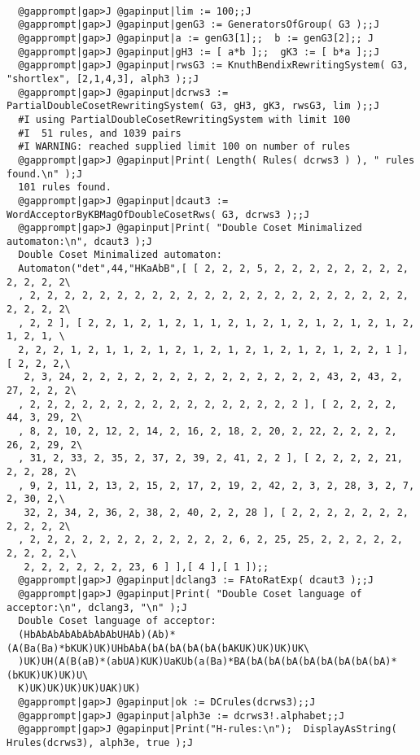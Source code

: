 \documentclass[a4paper,11pt]{report}
\begin{document}
{{ 
\begin{Verbatim}[commandchars=@|J,fontsize=\small,frame=single,label=Example]
  
  @gapprompt|gap>J @gapinput|lim := 100;;J
  @gapprompt|gap>J @gapinput|genG3 := GeneratorsOfGroup( G3 );;J
  @gapprompt|gap>J @gapinput|a := genG3[1];;  b := genG3[2];; J
  @gapprompt|gap>J @gapinput|gH3 := [ a*b ];;  gK3 := [ b*a ];;J
  @gapprompt|gap>J @gapinput|rwsG3 := KnuthBendixRewritingSystem( G3, "shortlex", [2,1,4,3], alph3 );;J
  @gapprompt|gap>J @gapinput|dcrws3 := PartialDoubleCosetRewritingSystem( G3, gH3, gK3, rwsG3, lim );;J
  #I using PartialDoubleCosetRewritingSystem with limit 100
  #I  51 rules, and 1039 pairs
  #I WARNING: reached supplied limit 100 on number of rules
  @gapprompt|gap>J @gapinput|Print( Length( Rules( dcrws3 ) ), " rules found.\n" );J
  101 rules found.
  @gapprompt|gap>J @gapinput|dcaut3 := WordAcceptorByKBMagOfDoubleCosetRws( G3, dcrws3 );;J
  @gapprompt|gap>J @gapinput|Print( "Double Coset Minimalized automaton:\n", dcaut3 );J
  Double Coset Minimalized automaton:
  Automaton("det",44,"HKaAbB",[ [ 2, 2, 2, 5, 2, 2, 2, 2, 2, 2, 2, 2, 2, 2, 2, 2\
  , 2, 2, 2, 2, 2, 2, 2, 2, 2, 2, 2, 2, 2, 2, 2, 2, 2, 2, 2, 2, 2, 2, 2, 2, 2, 2\
  , 2, 2 ], [ 2, 2, 1, 2, 1, 2, 1, 1, 2, 1, 2, 1, 2, 1, 2, 1, 2, 1, 2, 1, 2, 1, \
  2, 2, 2, 1, 2, 1, 1, 2, 1, 2, 1, 2, 1, 2, 1, 2, 1, 2, 1, 2, 2, 1 ], [ 2, 2, 2,\
   2, 3, 24, 2, 2, 2, 2, 2, 2, 2, 2, 2, 2, 2, 2, 2, 2, 43, 2, 43, 2, 27, 2, 2, 2\
  , 2, 2, 2, 2, 2, 2, 2, 2, 2, 2, 2, 2, 2, 2, 2, 2 ], [ 2, 2, 2, 2, 44, 3, 29, 2\
  , 8, 2, 10, 2, 12, 2, 14, 2, 16, 2, 18, 2, 20, 2, 22, 2, 2, 2, 2, 26, 2, 29, 2\
  , 31, 2, 33, 2, 35, 2, 37, 2, 39, 2, 41, 2, 2 ], [ 2, 2, 2, 2, 21, 2, 2, 28, 2\
  , 9, 2, 11, 2, 13, 2, 15, 2, 17, 2, 19, 2, 42, 2, 3, 2, 28, 3, 2, 7, 2, 30, 2,\
   32, 2, 34, 2, 36, 2, 38, 2, 40, 2, 2, 28 ], [ 2, 2, 2, 2, 2, 2, 2, 2, 2, 2, 2\
  , 2, 2, 2, 2, 2, 2, 2, 2, 2, 2, 2, 2, 6, 2, 25, 25, 2, 2, 2, 2, 2, 2, 2, 2, 2,\
   2, 2, 2, 2, 2, 2, 23, 6 ] ],[ 4 ],[ 1 ]);;
  @gapprompt|gap>J @gapinput|dclang3 := FAtoRatExp( dcaut3 );;J
  @gapprompt|gap>J @gapinput|Print( "Double Coset language of acceptor:\n", dclang3, "\n" );J
  Double Coset language of acceptor:
  (HbAbAbAbAbAbAbAbUHAb)(Ab)*(A(Ba(Ba)*bKUK)UK)UHbAbA(bA(bA(bA(bA(bAKUK)UK)UK)UK\
  )UK)UH(A(B(aB)*(abUA)KUK)UaKUb(a(Ba)*BA(bA(bA(bA(bA(bA(bA(bA(bA)*(bKUK)UK)UK)U\
  K)UK)UK)UK)UK)UAK)UK)
  @gapprompt|gap>J @gapinput|ok := DCrules(dcrws3);;J
  @gapprompt|gap>J @gapinput|alph3e := dcrws3!.alphabet;;J
  @gapprompt|gap>J @gapinput|Print("H-rules:\n");  DisplayAsString( Hrules(dcrws3), alph3e, true );J

\end{Verbatim}}}
\end{document}
